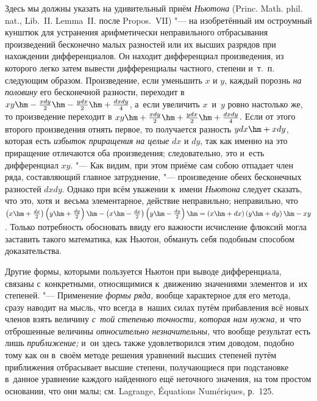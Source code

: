Здесь мы должны указать на удивительный приём {\em Ньютона} (Princ. Math.
phil. nat., Lib.~II. Lemma~II. после Propos.~VII) "--- на изобретённый им
остроумный кунштюк для устранения арифметически неправильного отбрасывания
произведений бесконечно малых разностей или их высших разрядов при
нахождении дифференциалов. Он находит дифференциал произведения, из
которого легко затем вывести дифференциалы частного, степени и~т.~п.
следующим образом. Произведение, если уменьшить $x$ и $y$, каждый порознь
{\em на половину} его бесконечной разности, переходит в
$xy\hm-\frac{xdy}2\hm-\frac{ydx}2\hm+\frac{dxdy}4$, а~если увеличить
$x$~и~$y$ ровно настолько же, то произведение переходит в
$xy\hm+\frac{xdy}2\hm+\frac{ydx}2\hm+\frac{dxdy}4$. Если от этого второго
произведения отнять первое, то получается разность $ydx\hm+xdy$, которая есть
{\em избыток приращения на целые} $dx$ и $dy$, так как именно на это приращение
отличаются оба произведения; следовательно, это и~есть дифференциал $xy$. "---
Как видим, при этом приёме сам собою отпадает член ряда, составляющий главное
затруднение, "--- произведение обеих бесконечных разностей $dxdy$. Однако при
всём уважении к~имени {\em Ньютона} следует сказать, что это, хотя и~весьма элементарное,
действие неправильно; неправильно, что
$\left(x\hm+\frac{dx}2\right)\left(y\hm+\frac{dy}2\right)\hm-
\left(x\hm-\frac{dx}2\right)\left(y\hm-\frac{dy}2\right)\hm=
\left(x\hm+dx\right)\left(y\hm+dy\right)\hm-xy$. Только потребность обосновать
ввиду его важности исчисление флюксий могла заставить такого математика, как
Ньютон, обмануть себя подобным способом доказательства.

Другие формы, которыми пользуется Ньютон при выводе дифференциала, связаны
с~конкретными, относящимися к~движению значениями элементов и~их степеней. "---
Применение {\em формы ряда,} вообще характерное для его метода,
сразу наводит на мысль, что всегда в~наших силах путём
прибавления всё новых членов взять величину
{\em с~той степенью точности, которая нам нужна,} и~что отброшенные
величины {\em относительно незначительны,} что вообще результат
есть лишь {\em приближение;} и~он здесь
также удовлетворился этим доводом, подобно тому как он в~своём методе
решения уравнений высших степеней путём приближения отбрасывает высшие
степени, получающиеся при подстановке в~данное уравнение каждого найденного
ещё неточного значения, на том простом основании, что они малы;
см. Lagrange, Équa\-ti\-ons Nu\-mé\-ri\-ques, р.~125.

